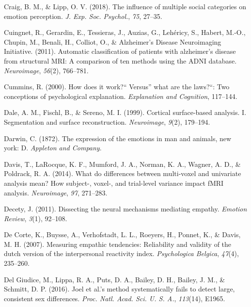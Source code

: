\documentclass[12pt,american,a4paper,oneside,]{memoir} %
\begin{document}
\leavevmode\hypertarget{ref-Craig2018-jm}{}%
Craig, B. M., \& Lipp, O. V. (2018). The influence of multiple social categories on emotion perception. \emph{J. Exp. Soc. Psychol.}, \emph{75}, 27--35.

\leavevmode\hypertarget{ref-Cuingnet2011-hv}{}%
Cuingnet, R., Gerardin, E., Tessieras, J., Auzias, G., Lehéricy, S., Habert, M.-O., Chupin, M., Benali, H., Colliot, O., \& Alzheimer's Disease Neuroimaging Initiative. (2011). Automatic classification of patients with alzheimer's disease from structural MRI: A comparison of ten methods using the ADNI database. \emph{Neuroimage}, \emph{56}(2), 766--781.

\leavevmode\hypertarget{ref-Cummins2000-pk}{}%
Cummins, R. (2000). How does it work?{}`` Versus'' what are the laws?{}``: Two conceptions of psychological explanation. \emph{Explanation and Cognition}, 117--144.

\leavevmode\hypertarget{ref-Dale1999-rk}{}%
Dale, A. M., Fischl, B., \& Sereno, M. I. (1999). Cortical surface-based analysis. I. Segmentation and surface reconstruction. \emph{Neuroimage}, \emph{9}(2), 179--194.

\leavevmode\hypertarget{ref-Darwin1872-nv}{}%
Darwin, C. (1872). The expression of the emotions in man and animals, new york: D. \emph{Appleton and Company}.

\leavevmode\hypertarget{ref-Davis2014-lw}{}%
Davis, T., LaRocque, K. F., Mumford, J. A., Norman, K. A., Wagner, A. D., \& Poldrack, R. A. (2014). What do differences between multi-voxel and univariate analysis mean? How subject-, voxel-, and trial-level variance impact fMRI analysis. \emph{Neuroimage}, \emph{97}, 271--283.

\leavevmode\hypertarget{ref-decety2011dissecting}{}%
Decety, J. (2011). Dissecting the neural mechanisms mediating empathy. \emph{Emotion Review}, \emph{3}(1), 92--108.

\leavevmode\hypertarget{ref-de2007measuring}{}%
De Corte, K., Buysse, A., Verhofstadt, L. L., Roeyers, H., Ponnet, K., \& Davis, M. H. (2007). Measuring empathic tendencies: Reliability and validity of the dutch version of the interpersonal reactivity index. \emph{Psychologica Belgica}, \emph{47}(4), 235--260.

\leavevmode\hypertarget{ref-Del_Giudice2016-ns}{}%
Del Giudice, M., Lippa, R. A., Puts, D. A., Bailey, D. H., Bailey, J. M., \& Schmitt, D. P. (2016). Joel et al.'s method systematically fails to detect large, consistent sex differences. \emph{Proc. Natl. Acad. Sci. U. S. A.}, \emph{113}(14), E1965.
\end{document}
